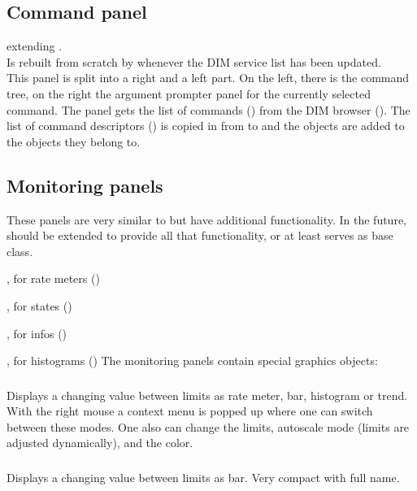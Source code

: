 \subsection{Command panel}
 extending .\\
Is rebuilt from scratch by  whenever the DIM service list has been updated.\\
This panel is split into a right and a left part. On the left, there is the command tree,
on the right the argument prompter panel for the currently selected command.
The panel gets the list of commands () from the DIM browser ().
The list of command descriptors () is copied in  from  to
 and the  objects are added to the
 objects they belong to.
\subsection{Monitoring panels}
These panels are very similar to  but have additional
functionality. 
 In the future,  should be extended to provide all that functionality, or at least serves as base class.
\bdes
\item [\class{xPanelMeter}:]  , for rate meters ()
\item [\class{xPanelState}:]  , for states ()
\item [\class{xPanelInfo}:]   , for infos ()
\item [\class{xPanelHisto}:]  , for histograms ()
\edes
The monitoring panels contain special graphics objects:
\subsubsection{}
Displays a changing value between limits as rate meter, bar, histogram or trend.
With the right mouse a context menu is popped up where one can switch between these
modes. One also can change the limits, autoscale mode (limits are adjusted dynamically),
and the color.
\subsubsection{}
Displays a changing value between limits as bar. Very compact with full name.
